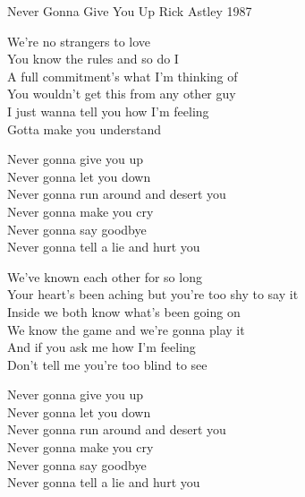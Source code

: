 \begin{song}{Never Gonna Give You Up}
  {} %
  {\SBOrgMel} %
  {Rick Astley} %
  {1987} %
  {\NotCCLIed} %

  \begin{SBVerse}
    We're no strangers to love\\
    You know the rules and so do I\\
    A full commitment's what I'm thinking of\\
    You wouldn't get this from any other guy\\\medskip
    I just wanna tell you how I'm feeling\\
    Gotta make you understand
  \end{SBVerse}

  \begin{SBChorus}
    Never gonna give you up\\
    Never gonna let you down\\
    Never gonna run around and desert you\\
    Never gonna make you cry\\
    Never gonna say goodbye\\
    Never gonna tell a lie and hurt you
  \end{SBChorus}

  \begin{SBVerse}
    We've known each other for so long\\
    Your heart's been aching but you're too shy to say it\\
    Inside we both know what's been going on\\
    We know the game and we're gonna play it\\\medskip
    And if you ask me how I'm feeling\\
    Don't tell me you're too blind to see
  \end{SBVerse}

  \begin{SBChorus}
    Never gonna give you up\\
    Never gonna let you down\\
    Never gonna run around and desert you\\
    Never gonna make you cry\\
    Never gonna say goodbye\\
    Never gonna tell a lie and hurt you
  \end{SBChorus}


\end{song}
